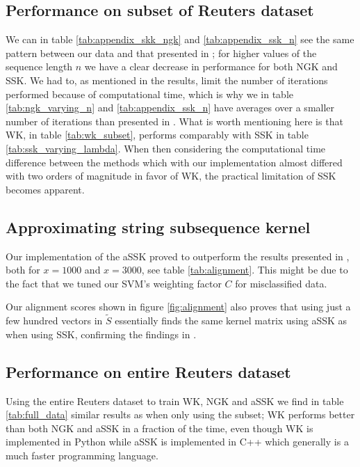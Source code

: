 \subsection{Performance on subset of Reuters dataset}
We can in table \ref{tab:appendix_skk_ngk} and \ref{tab:appendix_ssk_n} see the same pattern between our data and that presented in \cite{lodhi}; for higher values of the sequence length $ n $ we have a clear decrease in performance for both NGK and SSK. We had to, as mentioned in the results, limit the number of iterations performed because of computational time, which is why we in table \ref{tab:ngk_varying_n} and \ref{tab:appendix_ssk_n}  have averages over a smaller number of iterations than presented in \cite{lodhi}. What is worth mentioning here is that WK, in table \ref{tab:wk_subset}, performs comparably with SSK in table \ref{tab:ssk_varying_lambda}. When then considering the computational time difference between the methods which with our implementation almost differed with two orders of magnitude in favor of WK, the practical limitation of SSK becomes apparent. 

\subsection{Approximating string subsequence kernel}
Our implementation of the aSSK proved to outperform the results presented in \cite{lodhi}, both for $ x=1000 $ and $ x=3000 $, see table \ref{tab:alignment}. This might be due to the fact that we tuned our SVM's weighting factor $ C $ for misclassified data. 

Our alignment scores shown in figure \ref{fig:alignment} also proves that using just a few hundred vectors in $ \tilde{S} $ essentially finds the same kernel matrix using aSSK as when using SSK, confirming the findings in \cite{lodhi}.

\subsection{Performance on entire Reuters dataset}
Using the entire Reuters dataset to train WK, NGK and aSSK we find in table \ref{tab:full_data} similar results as when only using the subset; WK performs better than both NGK and aSSK in a fraction of the time, even though WK is implemented in Python while aSSK is implemented in C++ which generally is a much faster programming language. 


